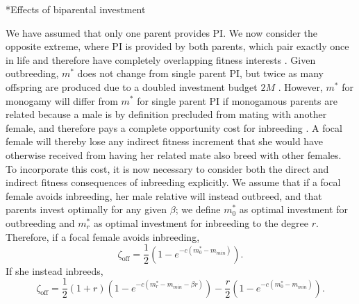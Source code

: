 \documentclass[12pt]{article}
\makeatletter
\renewcommand\subsection{\@startsection{subsection}{1}{-0.25in}{-0.5\baselineskip}{0.1\baselineskip}{\normalfont\normalsize\bfseries\textit}}
\makeatother
\begin{document}
\subsection*{Effects of biparental investment}

We have assumed that only one parent provides PI. We now consider the opposite extreme, where PI is provided by both parents, which pair exactly once in life and therefore have completely overlapping fitness interests \cite[i.e., strict monogamy; see][]{Parker1985}. Given outbreeding, $m^{*}$ does not change from single parent PI, but twice as many offspring are produced due to a doubled investment budget $2M$ \cite[][]{Parker1985}. However, $m^{*}$ for monogamy will differ from $m^{*}$ for single parent PI if monogamous parents are related because a male is by definition precluded from mating with another female, and therefore pays a complete opportunity cost for inbreeding \cite[][]{Waser1986}. A focal female will thereby lose any indirect fitness increment that she would have otherwise received from having her related mate also breed with other females. To incorporate this cost, it is now necessary to consider both the direct and indirect fitness consequences of inbreeding explicitly. We assume that if a focal female avoids inbreeding, her male relative will instead outbreed, and that parents invest optimally for any given $\beta$; we define $m^{*}_{0}$ as optimal investment for outbreeding and $m^{*}_{r}$ as optimal investment for inbreeding to the degree $r$. Therefore, if a focal female avoids inbreeding,
\begin{equation} \label{optPI}
\zeta_{\textrm{off}} = \frac{1}{2}\left(1-e^{-c\left(m^{*}_{0}-m_{min}\right)}\right).
\end{equation}
If she instead inbreeds,
\begin{equation} \label{optPIoc}
\zeta_{\textrm{off}} = \frac{1}{2}\left(1+r\right)\left(1-e^{-c\left(m^{*}_{r}-m_{min}-\beta r\right)}\right) - \frac{r}{2}\left(1-e^{-c\left(m^{*}_{0}-m_{min}\right)}\right).
\end{equation} 
\end{document}
